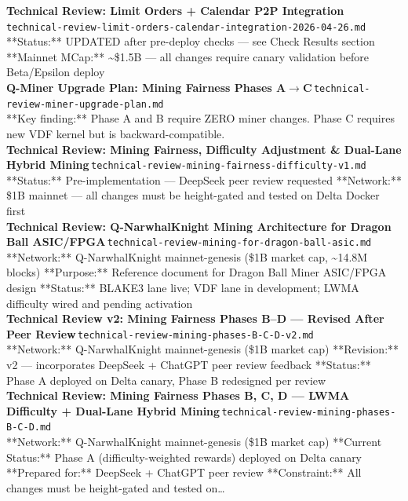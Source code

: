 \documentclass[11pt,a4paper]{article}
\begin{document}
\noindent\textbf{Technical Review: Limit Orders + Calendar P2P Integration}\,\textcolor{qgray}{\small \texttt{technical-review-limit-orders-calendar-integration-2026-04-26.md}}\\
**Status:** UPDATED after pre-deploy checks --- see Check Results section **Mainnet MCap:** \textasciitilde{}\$1.5B --- all changes require canary validation before Beta/Epsilon deploy\\[6pt]
\noindent\textbf{Q-Miner Upgrade Plan: Mining Fairness Phases A$\rightarrow$C}\,\textcolor{qgray}{\small \texttt{technical-review-miner-upgrade-plan.md}}\\
**Key finding:** Phase A and B require ZERO miner changes. Phase C requires new VDF kernel but is backward-compatible.\\[6pt]
\noindent\textbf{Technical Review: Mining Fairness, Difficulty Adjustment \& Dual-Lane Hybrid Mining}\,\textcolor{qgray}{\small \texttt{technical-review-mining-fairness-difficulty-v1.md}}\\
**Status:** Pre-implementation --- DeepSeek peer review requested **Network:** \$1B mainnet --- all changes must be height-gated and tested on Delta Docker first\\[6pt]
\noindent\textbf{Technical Review: Q-NarwhalKnight Mining Architecture for Dragon Ball ASIC/FPGA}\,\textcolor{qgray}{\small \texttt{technical-review-mining-for-dragon-ball-asic.md}}\\
**Network:** Q-NarwhalKnight mainnet-genesis (\$1B market cap, \textasciitilde{}14.8M blocks) **Purpose:** Reference document for Dragon Ball Miner ASIC/FPGA design **Status:** BLAKE3 lane live; VDF lane in development; LWMA difficulty wired and pending activation\\[6pt]
\noindent\textbf{Technical Review v2: Mining Fairness Phases B--D --- Revised After Peer Review}\,\textcolor{qgray}{\small \texttt{technical-review-mining-phases-B-C-D-v2.md}}\\
**Network:** Q-NarwhalKnight mainnet-genesis (\$1B market cap) **Revision:** v2 --- incorporates DeepSeek + ChatGPT peer review feedback **Status:** Phase A deployed on Delta canary, Phase B redesigned per review\\[6pt]
\noindent\textbf{Technical Review: Mining Fairness Phases B, C, D --- LWMA Difficulty + Dual-Lane Hybrid Mining}\,\textcolor{qgray}{\small \texttt{technical-review-mining-phases-B-C-D.md}}\\
**Network:** Q-NarwhalKnight mainnet-genesis (\$1B market cap) **Current Status:** Phase A (difficulty-weighted rewards) deployed on Delta canary **Prepared for:** DeepSeek + ChatGPT peer review **Constraint:** All changes must be height-gated and tested on\ldots{}\\[6pt]
\end{document}
